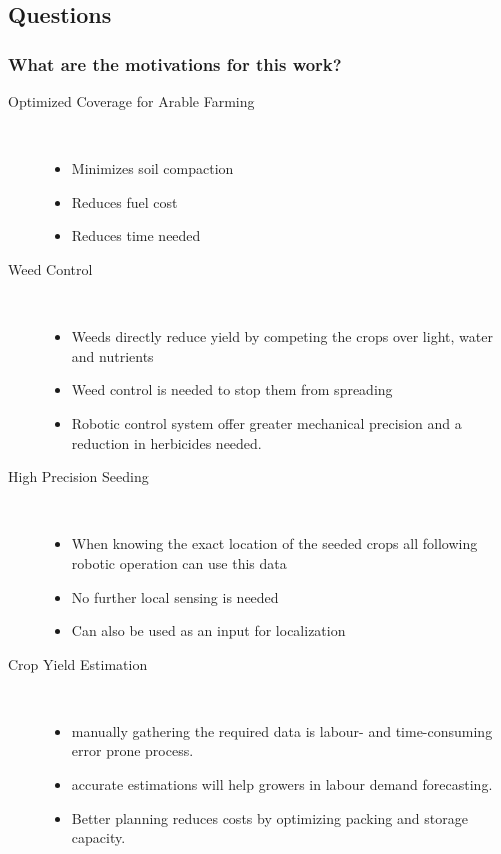 \subsection*{Questions}

\subsubsection*{What are the motivations for this work?}
\begin{description}

    \item[Optimized Coverage for Arable Farming] \
    \begin{itemize}
        \item Minimizes soil compaction
        \item Reduces fuel cost
        \item Reduces time needed
    \end{itemize}
    \item[Weed Control] \
    \begin{itemize}
        \item Weeds directly reduce yield by competing the crops over light, water and nutrients
        \item Weed control is needed to stop them from spreading
        \item Robotic control system offer greater mechanical precision and a reduction in herbicides needed.
    \end{itemize}
    \item[High Precision Seeding] \
    \begin{itemize}
        \item When knowing the exact location of the seeded crops all following robotic operation can use this data
        \item No further local sensing is needed
        \item Can also be used as an input for localization
    \end{itemize}
    \item[Crop Yield Estimation] \
    \begin{itemize}
        \item manually gathering the required data is labour- and time-consuming error prone process.
        \item accurate estimations will help growers in labour demand forecasting. 
        \item Better planning reduces costs by optimizing packing and storage capacity.

\end{itemize}
\end{description}
